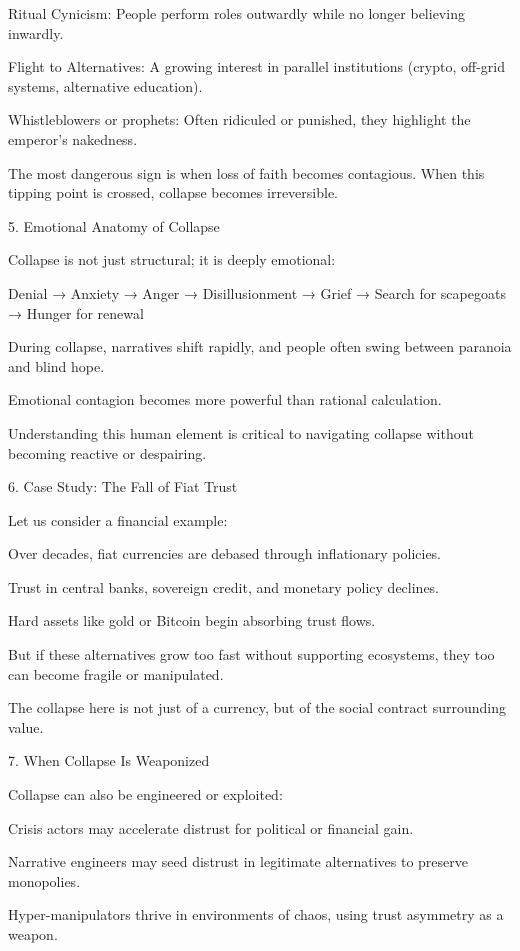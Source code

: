 \documentclass[11pt,oneside]{book}
\begin{document}
    Ritual Cynicism: People perform roles outwardly while no longer believing inwardly.

    Flight to Alternatives: A growing interest in parallel institutions (crypto, off-grid systems, alternative education).

    Whistleblowers or prophets: Often ridiculed or punished, they highlight the emperor’s nakedness.

The most dangerous sign is when loss of faith becomes contagious. When this tipping point is crossed, collapse becomes irreversible.

5. Emotional Anatomy of Collapse


Collapse is not just structural; it is deeply emotional:

    Denial → Anxiety → Anger → Disillusionment → Grief → Search for scapegoats → Hunger for renewal

    During collapse, narratives shift rapidly, and people often swing between paranoia and blind hope.

    Emotional contagion becomes more powerful than rational calculation.

Understanding this human element is critical to navigating collapse without becoming reactive or despairing.

6. Case Study: The Fall of Fiat Trust


Let us consider a financial example:

    Over decades, fiat currencies are debased through inflationary policies.

    Trust in central banks, sovereign credit, and monetary policy declines.

    Hard assets like gold or Bitcoin begin absorbing trust flows.

    But if these alternatives grow too fast without supporting ecosystems, they too can become fragile or manipulated.

The collapse here is not just of a currency, but of the social contract surrounding value.

7. When Collapse Is Weaponized


Collapse can also be engineered or exploited:

    Crisis actors may accelerate distrust for political or financial gain.

    Narrative engineers may seed distrust in legitimate alternatives to preserve monopolies.

    Hyper-manipulators thrive in environments of chaos, using trust asymmetry as a weapon.
\end{document}
